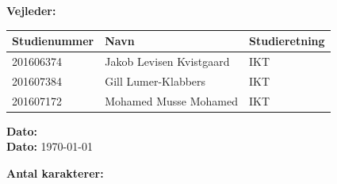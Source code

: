 \begin{center}
	\ifdefined\frontpageSupervisor
	\textbf{Vejleder:} \frontpageSupervisor\\
	\fi
	\vspace{10pt}
	\begin{tabular}{|l|l|l|}
		\hline
		\rowcolor{blue!25}
		\textbf{Studienummer} & \textbf{Navn} & \textbf{Studieretning} \\ [2pt]
		\hline
		201606374 & Jakob Levisen Kvistgaard & IKT \\
		\hline
		201607384 & Gill Lumer-Klabbers & IKT \\
		\hline
		201607172 & Mohamed Musse Mohamed & IKT \\
		\hline
	\end{tabular}

	\ifdefined\frontPageDate
		{
			\fontsize{10pt}{0}\selectfont
			\textbf{Dato: } \frontPageDate\\
		}
	\else
		{
			\fontsize{10pt}{0}\selectfont
			\textbf{Dato: } \today\\
		}	
	\fi
	\vspace{5pt}
	
	\ifdefined\frontpageCharacters
		\textbf{Antal karakterer: } \frontpageCharacters\\
	\fi
	\vspace{30pt}

\end{center}
\newpage